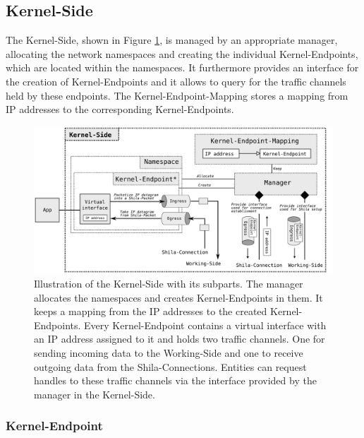 \subsection*{Kernel-Side}

The Kernel-Side, shown in Figure \ref{fig:ImplementationModulesKernelSide}, is managed by an appropriate manager, allocating the network namespaces and creating the individual Kernel-Endpoints, which are located within the namespaces. It furthermore provides an interface for the creation of Kernel-Endpoints and it allows to query for the traffic channels held by these endpoints. The Kernel-Endpoint-Mapping stores a mapping from IP addresses to the corresponding Kernel-Endpoints.  

\begin{figure}
	\begin{center}
		\def\svgwidth{1\textwidth}
		\includegraphics[scale=0.2]{../illustrations/implementation/ModulesKernelSide.pdf}   
		\caption[]{Illustration of the Kernel-Side with its subparts. The manager allocates the namespaces and creates Kernel-Endpoints in them. It keeps a mapping from the IP addresses to the created Kernel-Endpoints. Every Kernel-Endpoint contains a virtual interface with an IP address assigned to it and holds two traffic channels. One for sending incoming data to the Working-Side and one to receive outgoing data from the Shila-Connections. Entities can request handles to these traffic channels via the interface provided by the manager in the Kernel-Side.}
		\label{fig:ImplementationModulesKernelSide}
	\end{center}
\end{figure}


\subsubsection{Kernel-Endpoint}

